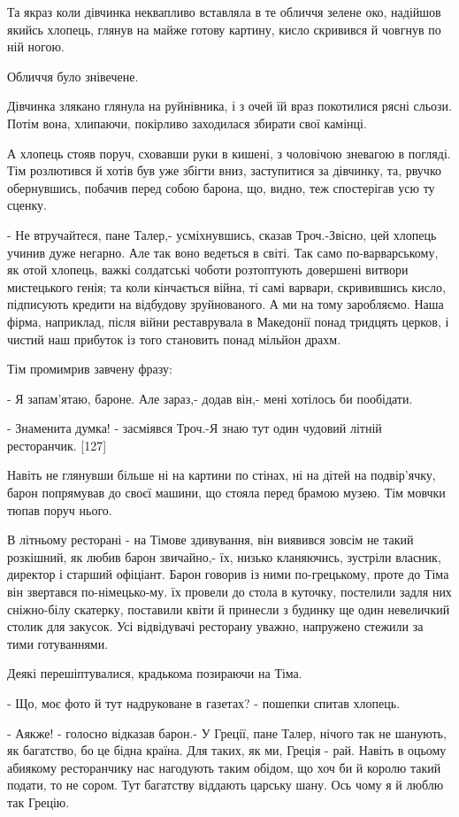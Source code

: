 Та якраз коли дівчинка неквапливо вставляла в те обличчя зелене око, надійшов якийсь хлопець, глянув на майже готову картину, кисло скривився й човгнув по ній ногою.

Обличчя було знівечене.

Дівчинка злякано глянула на руйнівника, і з очей їй враз покотилися рясні сльози. Потім вона, хлипаючи, покірливо заходилася збирати свої камінці.

А хлопець стояв поруч, сховавши руки в кишені, з чоловічою зневагою в погляді. Тім розлютився й хотів був уже збігти вниз, заступитися за дівчинку, та, рвучко обернувшись, побачив перед собою барона, що, видно, теж спостерігав усю ту сценку.

- Не втручайтеся, пане Талер,- усміхнувшись, сказав Троч.-Звісно, цей хлопець учинив дуже негарно. Але так воно ведеться в світі. Так само по-варварському, як отой хлопець, важкі солдатські чоботи розтоптують довершені витвори мистецького генія; та коли кінчається війна, ті самі варвари, скривившись кисло, підписують кредити на відбудову зруйнованого. А ми на тому заробляємо. Наша фірма, наприклад, після війни реставрувала в Македонії понад тридцять церков, і чистий наш прибуток із того становить понад мільйон драхм.

Тім промимрив завчену фразу:

- Я запам'ятаю, бароне. Але зараз,- додав він,- мені хотілось би пообідати.

- Знаменита думка! - засміявся Троч.-Я знаю тут один чудовий літній ресторанчик. [127]

Навіть не глянувши більше ні на картини по стінах, ні на дітей на подвір'ячку, барон попрямував до своєї машини, що стояла перед брамою музею. Тім мовчки тюпав поруч нього.

В літньому ресторані - на Тімове здивування, він виявився зовсім не такий розкішний, як любив барон звичайно,- їх, низько кланяючись, зустріли власник, директор і старший офіціант. Барон говорив із ними по-грецькому, проте до Тіма він звертався по-німецько-му. їх провели до стола в куточку, постелили задля них сніжно-білу скатерку, поставили квіти й принесли з будинку ще один невеличкий столик для закусок. Усі відвідувачі ресторану уважно, напружено стежили за тими готуваннями.

Деякі перешіптувалися, крадькома позираючи на Тіма.

- Що, моє фото й тут надруковане в газетах? - пошепки спитав хлопець.

- Аякже! - голосно відказав барон.- У Греції, пане Талер, нічого так не шанують, як багатство, бо це бідна країна. Для таких, як ми, Греція - рай. Навіть в оцьому абиякому ресторанчику нас нагодують таким обідом, що хоч би й королю такий подати, то не сором. Тут багатству віддають царську шану. Ось чому я й люблю так Грецію.

